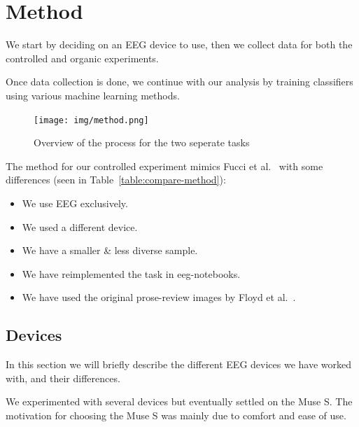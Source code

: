 \chapter{Method}

We start by deciding on an EEG device to use, then we collect data for both the controlled and organic experiments.

Once data collection is done, we continue with our analysis by training classifiers using various machine learning methods.

\begin{figure}[h]
    \begin{center}
        \texttt{[image: img/method.png]}
    \end{center}
    \caption{Overview of the process for the two seperate tasks}\label{fig:method}
\end{figure}

The method for our controlled experiment mimics Fucci et al.~\cite{fucci_replication_2019} with some differences (seen in Table~\ref{table:compare-method}): 

\begin{itemize}
        \item We use EEG exclusively.
        \item We used a different device.
        \item We have a smaller \& less diverse sample.
        \item We have reimplemented the task in eeg-notebooks.
        \item We have used the original prose-review images by Floyd et al.~\cite{floyd_decoding_2017}.
\end{itemize}

\begin{landscape}
    
\end{landscape}

\section{Devices}
    
    In this section we will briefly describe the different EEG devices we have worked with, and their differences.

    We experimented with several devices but eventually settled on the Muse S. The motivation for choosing the Muse S was mainly due to comfort and ease of use. 

